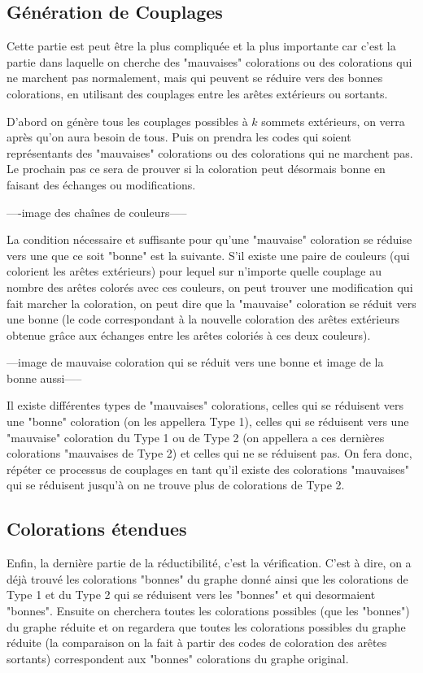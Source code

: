 \documentclass[10pt,a4paper]{article}
\begin{document}
\subsection{Génération de Couplages}

Cette partie est peut être la plus compliquée et la plus importante car c'est la partie dans laquelle on cherche des "mauvaises" colorations ou des colorations qui ne marchent pas normalement, mais qui peuvent se réduire vers des bonnes colorations, en utilisant des couplages entre les arêtes extérieurs ou sortants. 

D'abord on génère tous les couplages possibles à $k$ sommets extérieurs, on verra après qu'on aura besoin de tous. Puis on prendra les codes qui soient représentants des "mauvaises" colorations ou des colorations qui ne marchent pas. Le prochain pas ce sera de prouver si la coloration peut désormais bonne en faisant des échanges ou modifications. 

----image des chaînes de couleurs-----

La condition nécessaire et suffisante pour qu'une "mauvaise" coloration se réduise vers une que ce soit "bonne" est la suivante. S'il existe une paire de couleurs (qui colorient les arêtes extérieurs) pour lequel sur n'importe quelle couplage au nombre des arêtes colorés avec ces couleurs, on peut trouver une modification qui fait marcher la coloration, on peut dire que la "mauvaise" coloration se réduit vers une bonne (le code correspondant à la nouvelle coloration des arêtes extérieurs obtenue grâce aux échanges entre les arêtes coloriés à ces deux couleurs).

---image de mauvaise coloration qui se réduit vers une bonne et image de la bonne aussi-----

Il existe différentes types de "mauvaises" colorations, celles qui se réduisent vers une "bonne" coloration (on les appellera Type 1), celles qui se réduisent vers une "mauvaise" coloration du Type 1 ou de Type 2 (on appellera a ces dernières colorations "mauvaises de Type 2) et celles qui ne se réduisent pas. On fera donc, répéter ce processus de couplages en tant qu'il existe des colorations "mauvaises" qui se réduisent jusqu'à on ne trouve plus de colorations de Type 2.

\subsection{Colorations étendues}

Enfin, la dernière partie de la réductibilité, c'est la vérification. C'est à dire, on a déjà trouvé les colorations "bonnes" du graphe donné ainsi que les colorations de Type 1 et du Type 2 qui se réduisent vers les "bonnes" et qui desormaient "bonnes". Ensuite on cherchera toutes les colorations possibles (que les "bonnes") du graphe réduite et on regardera que toutes les colorations possibles du graphe réduite (la comparaison on la fait à partir des codes de coloration des arêtes sortants) correspondent aux "bonnes" colorations du graphe original. 
\end{document}
